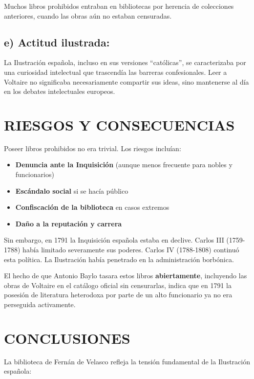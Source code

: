 \documentclass[12pt,a4paper]{article}
\begin{document}
Muchos libros prohibidos entraban en bibliotecas por herencia de colecciones anteriores, cuando las obras aún no estaban censuradas.

\subsection*{e) Actitud ilustrada:}

La Ilustración española, incluso en sus versiones ``católicas'', se caracterizaba por una curiosidad intelectual que trascendía las barreras confesionales. Leer a Voltaire no significaba necesariamente compartir sus ideas, sino mantenerse al día en los debates intelectuales europeos.

\section{RIESGOS Y CONSECUENCIAS}

Poseer libros prohibidos no era trivial. Los riesgos incluían:

\begin{itemize}
    \item \textbf{Denuncia ante la Inquisición} (aunque menos frecuente para nobles y funcionarios)
    \item \textbf{Escándalo social} si se hacía público
    \item \textbf{Confiscación de la biblioteca} en casos extremos
    \item \textbf{Daño a la reputación y carrera}
\end{itemize}

Sin embargo, en 1791 la Inquisición española estaba en declive. Carlos III (1759-1788) había limitado severamente sus poderes. Carlos IV (1788-1808) continuó esta política. La Ilustración había penetrado en la administración borbónica.

El hecho de que Antonio Baylo tasara estos libros \textbf{abiertamente}, incluyendo las obras de Voltaire en el catálogo oficial sin censurarlas, indica que en 1791 la posesión de literatura heterodoxa por parte de un alto funcionario ya no era perseguida activamente.

\section{CONCLUSIONES}

La biblioteca de Fernán de Velasco refleja la tensión fundamental de la Ilustración española:
\end{document}
